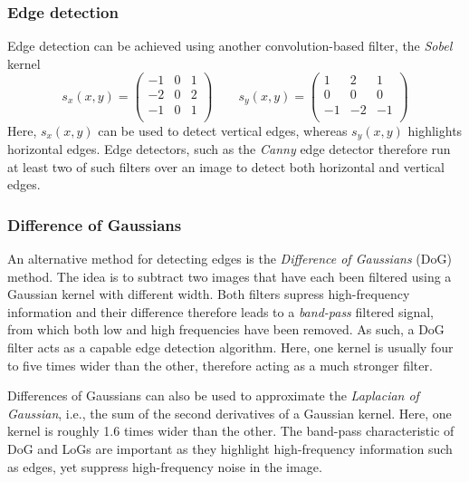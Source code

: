 \subsubsection{Edge detection}\label{sec:sobel}
Edge detection can be achieved using another convolution-based filter, the \emph{Sobel} kernel
\begin{equation}
s_x(x,y)=
\left(
\begin{array}{ccc}
-1 & 0 & 1\\
-2 & 0 & 2\\
-1 & 0 & 1\\
\end{array}
\right)
\qquad
s_y(x,y)=
\left(
\begin{array}{ccc}
1 & 2 & 1\\
0 & 0 & 0\\
-1 & -2 & -1\\
\end{array}
\right)
\end{equation}
Here, $s_x(x,y)$ can be used to detect vertical edges, whereas $s_y(x,y)$ highlights horizontal edges. Edge detectors, such as the \emph{Canny} edge detector  therefore run at least two of such filters over an image to detect both horizontal and vertical edges.

\subsubsection{Difference of Gaussians}
An alternative method for detecting edges is the \emph{Difference of Gaussians} (DoG) method. The idea is to subtract two images that have each been filtered using a Gaussian kernel with different width. Both filters supress high-frequency information and their difference therefore leads to a \emph{band-pass} filtered signal, from which both low and high frequencies have been removed. As such, a DoG filter acts as a capable edge detection algorithm. Here, one kernel is usually four to five times wider than the other, therefore acting as a much stronger filter.

Differences of Gaussians can also be used to approximate the \emph{Laplacian of Gaussian}, i.e., the sum of the second derivatives of a Gaussian kernel. Here, one kernel is roughly 1.6 times wider than the other. The band-pass characteristic of DoG and LoGs are important as they highlight high-frequency information such as edges, yet suppress high-frequency noise in the image.


